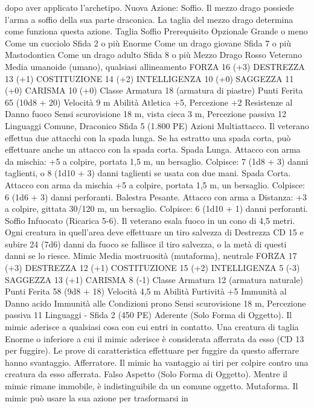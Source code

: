 \begin{multicols}{2}
dopo aver applicato l’archetipo.
Nuova Azione: Soffio. Il mezzo drago possiede l’arma
a soffio della sua parte draconica. La taglia del mezzo
drago determina come funziona questa azione.
Taglia Soffio Prerequisito Opzionale
Grande o meno Come un cucciolo Sfida 2 o più
Enorme Come un drago giovane Sfida 7 o più
Mastodontica Come un drago adulto Sfida 8 o più
Mezzo Drago Rosso Veterano
Media umanoide (umano), qualsiasi allineamento
FORZA 16 (+3)
DESTREZZA 13 (+1)
COSTITUZIONE 14 (+2)
INTELLIGENZA 10 (+0)
SAGGEZZA 11 (+0)
CARISMA 10 (+0)
Classe Armatura 18 (armatura di piastre)
Punti Ferita 65 (10d8 + 20)
Velocità 9 m
Abilità Atletica +5, Percezione +2
Resistenze al Danno fuoco
Sensi scurovisione 18 m, vista cieca 3 m, Percezione passiva 12
Linguaggi Comune, Draconico
Sfida 5 (1.800 PE)
Azioni
Multiattacco. Il veterano effettua due attacchi con la spada
lunga. Se ha estratto una spada corta, può effettuare anche un
attacco con la spada corta.
Spada Lunga. Attacco con arma da mischia: +5 a colpire,
portata 1,5 m, un bersaglio.
Colpisce: 7 (1d8 + 3) danni taglienti, o 8 (1d10 + 3) danni
taglienti se usata con due mani.
Spada Corta. Attacco con arma da mischia +5 a colpire, portata
1,5 m, un bersaglio.
Colpisce: 6 (1d6 + 3) danni perforanti.
Balestra Pesante. Attacco con arma a Distanza: +3 a colpire,
gittata 30/120 m, un bersaglio.
Colpisce: 6 (1d10 + 1) danni perforanti.
Soffio Infuocato (Ricarica 5-6). Il veterano esala fuoco in un
cono di 4,5 metri. Ogni creatura in quell’area deve effettuare un
tiro salvezza di Destrezza CD 15 e subire 24 (7d6) danni da
fuoco se fallisce il tiro salvezza, o la metà di questi danni se lo
riesce.
Mimic
Media mostruosità (mutaforma), neutrale
FORZA 17 (+3)
DESTREZZA 12 (+1)
COSTITUZIONE 15 (+2)
INTELLIGENZA 5 (-3)
SAGGEZZA 13 (+1)
CARISMA 8 (-1)
Classe Armatura 12 (armatura naturale)
Punti Ferita 58 (9d8 + 18)
Velocità 4,5 m
Abilità Furtività +5
Immunità al Danno acido
Immunità alle Condizioni prono
Sensi scurovisione 18 m, Percezione passiva 11
Linguaggi -
Sfida 2 (450 PE)
Aderente (Solo Forma di Oggetto). Il mimic aderisce a qualsiasi
cosa con cui entri in contatto. Una creatura di taglia Enorme o
inferiore a cui il mimic aderisce è considerata afferrata da esso
(CD 13 per fuggire). Le prove di caratteristica effettuare per
fuggire da questo afferrare hanno svantaggio.
Afferratore. Il mimic ha vantaggio ai tiri per colpire contro una
creatura da esso afferrata.
Falso Aspetto (Solo Forma di Oggetto). Mentre il mimic rimane
immobile, è indistinguibile da un comune oggetto.
Mutaforma. Il mimic può usare la sua azione per trasformarsi in

\end{multicols}
